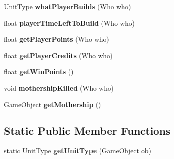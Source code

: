 \begin{DoxyCompactItemize}
\item 
\hypertarget{class_game_controller_ac495e4efd53d19999dcb5d6c14acceb8}{}Unit\+Type {\bfseries what\+Player\+Builds} (Who who)\label{class_game_controller_ac495e4efd53d19999dcb5d6c14acceb8}

\item 
\hypertarget{class_game_controller_a363d3a30e9b342193fd4f27287d4daf1}{}float {\bfseries player\+Time\+Left\+To\+Build} (Who who)\label{class_game_controller_a363d3a30e9b342193fd4f27287d4daf1}

\item 
\hypertarget{class_game_controller_a72e4937c7dcadf16ae55bd2316d4c701}{}float {\bfseries get\+Player\+Points} (Who who)\label{class_game_controller_a72e4937c7dcadf16ae55bd2316d4c701}

\item 
\hypertarget{class_game_controller_a1fd920b0ec40173da587192a724960fd}{}float {\bfseries get\+Player\+Credits} (Who who)\label{class_game_controller_a1fd920b0ec40173da587192a724960fd}

\item 
\hypertarget{class_game_controller_a102d9ddd5f0d8951264a34ec995a6137}{}float {\bfseries get\+Win\+Points} ()\label{class_game_controller_a102d9ddd5f0d8951264a34ec995a6137}

\item 
\hypertarget{class_game_controller_a7355dd4edaaac2850e198badb10f05e2}{}void {\bfseries mothership\+Killed} (Who who)\label{class_game_controller_a7355dd4edaaac2850e198badb10f05e2}

\item 
\hypertarget{class_game_controller_a60197a1686c4b7ead8b4def6c2346313}{}Game\+Object {\bfseries get\+Mothership} ()\label{class_game_controller_a60197a1686c4b7ead8b4def6c2346313}

\end{DoxyCompactItemize}
\subsection*{Static Public Member Functions}
\begin{DoxyCompactItemize}
\item 
\hypertarget{class_game_controller_ae3f5a83f04b65f5a56538bcf4e04f0b6}{}static Unit\+Type {\bfseries get\+Unit\+Type} (Game\+Object ob)\label{class_game_controller_ae3f5a83f04b65f5a56538bcf4e04f0b6}

\end{DoxyCompactItemize}
